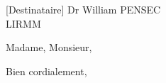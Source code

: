 \documentclass[a4paper]{lirmm-letter}
\begin{document}
\begin{letter}[Destinataire]
              {Dr William PENSEC\\
               LIRMM}
\opening{Madame, Monsieur,}



\closing{Bien cordialement,}


\end{letter}
\end{document}
